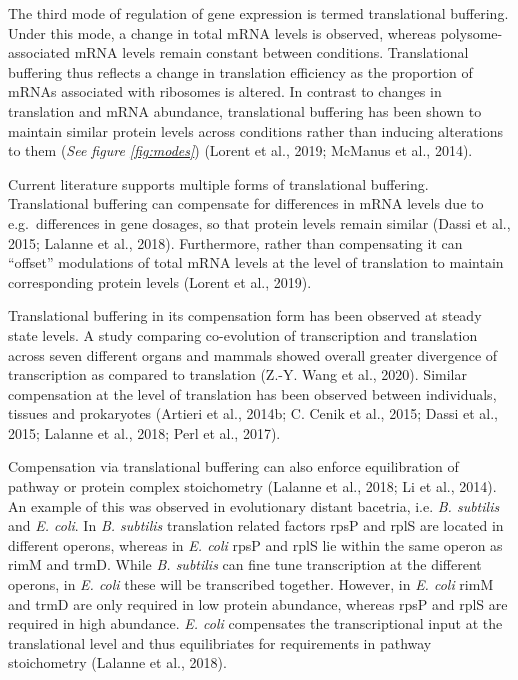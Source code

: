 \documentclass[12pt,openany]{book}
\begin{document}
The third mode of regulation of gene expression is termed translational
buffering. Under this mode, a change in total mRNA levels is observed,
whereas polysome-associated mRNA levels remain constant between
conditions. Translational buffering thus reflects a change in
translation efficiency as the proportion of mRNAs associated with
ribosomes is altered. In contrast to changes in translation and mRNA
abundance, translational buffering has been shown to maintain similar
protein levels across conditions rather than inducing alterations to
them (\emph{See figure \ref{fig:modes}}) (Lorent et al., 2019; McManus
et al., 2014).

Current literature supports multiple forms of translational buffering.
Translational buffering can compensate for differences in mRNA levels
due to e.g.~differences in gene dosages, so that protein levels remain
similar (Dassi et al., 2015; Lalanne et al., 2018). Furthermore, rather
than compensating it can ``offset'' modulations of total mRNA levels at
the level of translation to maintain corresponding protein levels
(Lorent et al., 2019).

Translational buffering in its compensation form has been observed at
steady state levels. A study comparing co-evolution of transcription and
translation across seven different organs and mammals showed overall
greater divergence of transcription as compared to translation (Z.-Y.
Wang et al., 2020). Similar compensation at the level of translation has
been observed between individuals, tissues and prokaryotes (Artieri et
al., 2014b; C. Cenik et al., 2015; Dassi et al., 2015; Lalanne et al.,
2018; Perl et al., 2017).

Compensation via translational buffering can also enforce equilibration
of pathway or protein complex stoichometry (Lalanne et al., 2018; Li et
al., 2014). An example of this was observed in evolutionary distant
bacetria, i.e. \emph{B. subtilis} and \emph{E. coli}. In \emph{B.
subtilis} translation related factors rpsP and rplS are located in
different operons, whereas in \emph{E. coli} rpsP and rplS lie within
the same operon as rimM and trmD. While \emph{B. subtilis} can fine tune
transcription at the different operons, in \emph{E. coli} these will be
transcribed together. However, in \emph{E. coli} rimM and trmD are only
required in low protein abundance, whereas rpsP and rplS are required in
high abundance. \emph{E. coli} compensates the transcriptional input at
the translational level and thus equilibriates for requirements in
pathway stoichometry (Lalanne et al., 2018).
\end{document}
